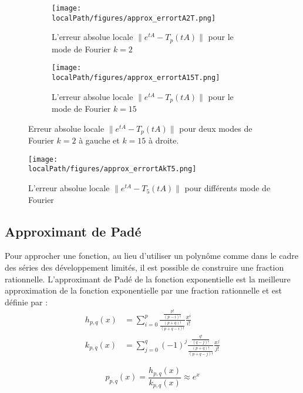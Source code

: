 
\begin{figure}
  \begin{subfigure}{.5\textwidth}
    \centering
    \texttt{[image: \\localPath/figures/approx\_errortA2T.png]}
    \caption{L'erreur absolue locale $\|e^{tA}-T_p(tA)\|$ pour le mode de Fourier $k=2$}
  \end{subfigure}
  \begin{subfigure}{.5\textwidth}
    \centering
    \texttt{[image: \\localPath/figures/approx\_errortA15T.png]}
    \caption{L'erreur absolue locale $\|e^{tA}-T_p(tA)\|$ pour le mode de Fourier $k=15$}
  \end{subfigure}
  \caption{Erreur absolue locale $\|e^{tA}-T_p(tA)\|$ pour deux modes de Fourier $k=2$ à gauche et $k=15$ à droite.}
\end{figure}

\begin{figure}
  \centering
  \texttt{[image: \\localPath/figures/approx\_errortAkT5.png]}
  \caption{L'erreur absolue locale $\|e^{tA}-T_5(tA)\|$ pour différents mode de Fourier}
\end{figure}

\subsection{Approximant de Padé}

Pour approcher une fonction, au lieu d'utiliser un polynôme comme dans le cadre des séries des développement limités, il est possible de construire une fraction rationnelle. L'approximant de Padé de la fonction exponentielle est la meilleure approximation de la fonction exponentielle par une fraction rationnelle et est définie par :
$$
  \begin{aligned}
    h_{p,q}(x) &= \sum_{i=0}^p \frac{\frac{p!}{(p-i)!}}{\frac{(p+q)!}{(p+q-i)!}}\frac{x^i}{i!} \\
    k_{p,q}(x) &= \sum_{j=0}^q (-1)^j \frac{\frac{q!}{(q-j)!}}{\frac{(p+q)!}{(p+q-j)!}} \frac{x^j}{j!}
  \end{aligned}
$$

$$
  p_{p,q}(x) = \frac{h_{p,q}(x)}{k_{p,q}(x)} \approx e^x
$$

